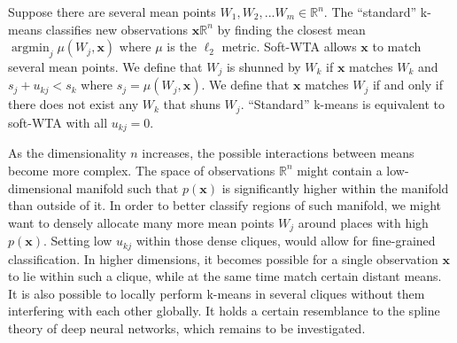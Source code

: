 \documentclass[12pt]{article}
\DeclareMathOperator*{\argmin}{argmin}
\begin{document}
Suppose there are several mean points $W_1,W_2,...W_m\in \mathbb{R}^n$. The ``standard'' k-means classifies new observations $\boldsymbol{x}\mathbb{R}^n$ by finding the closest mean $\argmin_j \mu(W_j,\boldsymbol{x})$ where $\mu$ is the $\ell_2$ metric. Soft-WTA allows $\boldsymbol{x}$ to match several mean points. We define that $W_j$ is shunned by $W_k$ if $\boldsymbol{x}$ matches $W_k$ and $s_j + u_{kj} < s_k$ where $s_j=\mu(W_j,\boldsymbol{x})$. We define that $\boldsymbol{x}$ matches $W_j$ if and only if there does not exist any $W_k$ that shuns $W_j$. ``Standard'' k-means is equivalent to soft-WTA with all $u_{kj}=0$.

As the dimensionality $n$ increases, the possible interactions between means become more complex. The space of observations $\mathbb{R}^n$ might contain a low-dimensional manifold such that $p(\boldsymbol{x})$ is significantly higher within the manifold than outside of it. In order to better classify regions of such manifold, we might want to densely allocate many more mean points $W_j$ around places with high $p(\boldsymbol{x})$. Setting low $u_{kj}$ within those dense cliques,  would allow for fine-grained classification. In higher dimensions, it becomes possible for a single observation $\boldsymbol{x}$ to lie within such a clique, while at the same time match certain distant means. It is also possible to locally perform k-means in several cliques without them interfering with each other globally. It holds a certain resemblance to the spline theory of deep neural networks, which remains to be investigated.

 








    
\end{document}
